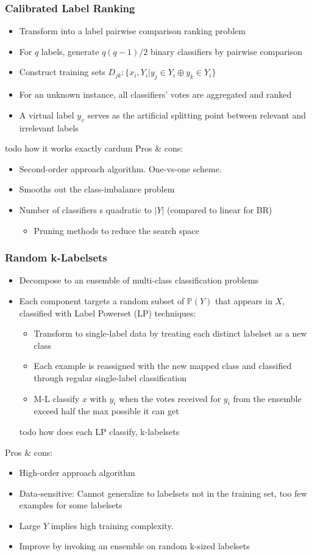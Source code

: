\documentclass{beamer}
\begin{document}
\begin{frame}
\frametitle{Calibrated Label Ranking}
\begin{itemize}
\item Transform into a label pairwise comparison ranking problem
\item For $q$ labels, generate $q(q-1)/2$ binary classifiers by pairwise comparison
\item Construct training sets $D_{jk} : \{x_i, Y_i | y_j \in Y_i \oplus y_k \in Y_i\}$
\item For an unknown instance, all classifiers' votes are aggregated and ranked
\item A virtual label $y_v$ serves as the artificial splitting point between relevant and irrelevant labels
\end{itemize}
todo how it works exactly cardum
Pros \& cons:
\begin{itemize}
\item Second-order approach algorithm. One-vs-one scheme.
\item Smooths out the class-imbalance problem
\item Number of classifiers s quadratic to $|Y|$ (compared to linear for BR)
\begin{itemize}
\item Pruning methods to reduce the search space
\end{itemize}
\end{itemize}
\end{frame}
\begin{frame}
\frametitle{Random k-Labelsets}
\begin{itemize}
\item Decompose to an ensemble of multi-class classification problems
\item Each component targets a random subset of $\mathbb{P}(Y)$ that appears in $X$, classified with Label Powerset (LP) techniques:
\begin{itemize}
\item Transform to single-label data by treating each distinct labelset as a new class
\item Each example is reassigned with the new mapped class and classified through regular single-label classification
\item M-L classify $x$ with $y_i$ when the votes received for $y_i$ from the ensemble exceed half the max possible it can get
\end{itemize}
todo how does each LP classify, k-labelsets
\end{itemize}
Pros \& cons:
\begin{itemize}
\item High-order approach algorithm
\item Data-sensitive: Cannot generalize to labelsets not in the training set, too few examples for some labelsets
\item Large $Y$ implies high training complexity.
\item Improve by invoking an ensemble on random k-sized labelsets
\end{itemize}
\end{frame}
\end{document}

